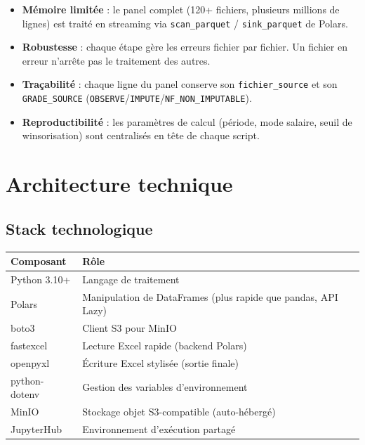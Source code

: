 \documentclass[12pt,a4paper,french]{report}
\newcommand{\colname}[1]{\texttt{#1}}
\begin{document}
\begin{itemize}
  \item \textbf{Mémoire limitée} : le panel complet (120+ fichiers, plusieurs
        millions de lignes) est traité en streaming via
        \texttt{scan\_parquet} / \texttt{sink\_parquet} de Polars.
  \item \textbf{Robustesse} : chaque étape gère les erreurs fichier par fichier.
        Un fichier en erreur n'arrête pas le traitement des autres.
  \item \textbf{Traçabilité} : chaque ligne du panel conserve son
        \colname{fichier\_source} et son \colname{GRADE\_SOURCE}
        (\texttt{OBSERVE}/\texttt{IMPUTE}/\texttt{NF\_NON\_IMPUTABLE}).
  \item \textbf{Reproductibilité} : les paramètres de calcul (période, mode
        salaire, seuil de winsorisation) sont centralisés en tête de chaque
        script.
\end{itemize}

\chapter{Architecture technique}

\section{Stack technologique}

\begin{tabularx}{\textwidth}{lX}
  \toprule
  \textbf{Composant} & \textbf{Rôle} \\
  \midrule
  Python 3.10+ & Langage de traitement \\
  Polars & Manipulation de DataFrames (plus rapide que pandas, API Lazy) \\
  boto3 & Client S3 pour MinIO \\
  fastexcel & Lecture Excel rapide (backend Polars) \\
  openpyxl & Écriture Excel stylisée (sortie finale) \\
  python-dotenv & Gestion des variables d'environnement \\
  MinIO & Stockage objet S3-compatible (auto-hébergé) \\
  JupyterHub & Environnement d'exécution partagé \\
  \bottomrule
\end{tabularx}
\end{document}
